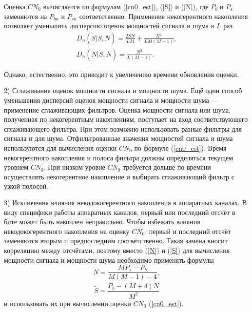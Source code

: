 \documentclass{article}
\begin{document}
Оценка $CN_{0}$ вычисляется по формулам (\ref{cn0_est}), (\ref{S}) и (\ref{N}), где $P_{b}$ и $P_{s}$ заменяются на $P_{bn}$ и $P_{sn}$ соответственно. Применение некогерентного накопления позволяет уменьшить дисперсию оценок мощностей сигнала и шума в $L$ раз
\begin{gather}
D_{n}(\widetilde{S}|S, N) = \frac{2SN}{LM} + \frac{N^{2}}{LM(M-1)}, \label{D_noncoh}\\
D_{n}(\widetilde{N}|S, N) = \frac{N^{2}}{L(M-1)}.
\end{gather}

Однако, естественно, это приводит к увеличению времени обновления оценки.


2) Сглаживание оценок мощности сигнала и мощности шума. Ещё один способ уменьшения дисперсий оценок мощности сигнала и мощности шума --- применение сглаживающих фильтров. Оценка мощности сигнала или шума, полученная по некогерентным накоплениям, поступает на вход соответствующего сглаживающего фильтра. При этом возможно использовать разные фильтры для сигнала и для шума. Отфильтрованные значения мощностей сигнала и шума используются для вычисления оценки $CN_{0}$ по формуле (\ref{cn0_est}). Время некогерентного накопления и полоса фильтра должны определяться текущем уровнем $CN_{0}$. При низком уровне $CN_{0}$ требуется дольше по времени осуществлять некогерентное накопление и выбирать сглаживающий фильтр с узкой полосой.

%

3) Исключения влияния некодокогерентного накопления в аппаратных каналах. В виду специфики работы аппаратных каналов, первый или последний отсчёт в бите может быть накоплен неправильно. Чтобы избежать влияния некодокогерентного накопления на оценку $CN_{0}$, первый и последний отсчёт заменяются вторым и предпоследним соответственно. Такая замена вносит корреляцию между отсчётами, поэтому вместо (\ref{N}) и (\ref{S}) для вычисления мощности сигнала и мощности шума необходимо применять формулы
\begin{equation}
\widetilde{N} = \frac{MP_{s}-P_{b}}{M(M-1)-4},
\end{equation}
\begin{equation}
\widetilde{S} = \frac{P_{b}-(M+4)\widetilde{N}}{M^{2}}
\end{equation}
и использовать их при вычислении оценки $CN_{0}$ (\ref{cn0_est}).
\end{document}
